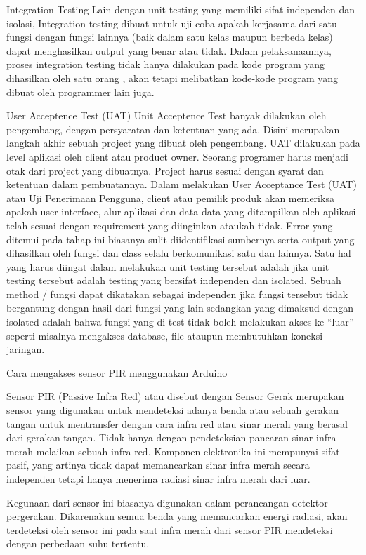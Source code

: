 Integration Testing
Lain dengan unit testing yang memiliki sifat independen dan isolasi, Integration testing dibuat untuk uji coba apakah kerjasama dari satu fungsi dengan fungsi lainnya (baik dalam satu kelas maupun berbeda kelas) dapat menghasilkan output yang benar atau tidak. Dalam pelaksanaannya, proses integration testing tidak hanya dilakukan pada kode program yang dihasilkan oleh satu orang , akan tetapi melibatkan  kode-kode program yang dibuat oleh programmer lain juga.

User Acceptence Test (UAT)
Unit Acceptence Test banyak dilakukan oleh pengembang, dengan persyaratan dan ketentuan yang ada. Disini merupakan langkah akhir sebuah project yang dibuat oleh pengembang. UAT dilakukan pada level aplikasi oleh client atau product owner. Seorang programer harus menjadi otak dari project yang dibuatnya. Project harus sesuai dengan syarat dan ketentuan dalam pembuatannya.
Dalam melakukan User Acceptance Test (UAT) atau Uji Penerimaan Pengguna, client atau pemilik produk akan memeriksa apakah user interface, alur aplikasi dan data-data yang ditampilkan oleh aplikasi telah sesuai dengan requirement yang diinginkan ataukah tidak. Error yang ditemui pada tahap ini biasanya sulit diidentifikasi sumbernya serta output yang dihasilkan oleh fungsi dan class selalu berkomunikasi satu dan lainnya.
Satu hal yang harus diingat dalam melakukan unit testing tersebut adalah jika unit testing tersebut adalah testing yang bersifat independen dan isolated. Sebuah method / fungsi dapat dikatakan sebagai independen jika fungsi tersebut tidak bergantung dengan hasil dari fungsi yang lain sedangkan yang dimaksud dengan isolated adalah bahwa fungsi yang di test tidak boleh melakukan akses ke “luar” seperti misalnya mengakses database, file ataupun membutuhkan koneksi jaringan.


Cara mengakses sensor PIR menggunakan Arduino

Sensor PIR (Passive Infra Red) atau disebut dengan Sensor Gerak merupakan sensor yang digunakan untuk mendeteksi adanya benda atau sebuah gerakan tangan untuk mentransfer dengan cara infra red atau sinar merah yang berasal dari gerakan tangan. Tidak hanya dengan pendeteksian pancaran sinar infra merah melaikan sebuah infra red.
Komponen elektronika ini mempunyai sifat pasif, yang artinya tidak dapat memancarkan sinar infra merah secara independen tetapi hanya menerima radiasi sinar infra merah dari luar.

Kegunaan dari sensor ini biasanya digunakan dalam perancangan detektor pergerakan. Dikarenakan semua benda yang memancarkan energi radiasi, akan terdeteksi oleh sensor ini pada saat infra merah dari sensor PIR mendeteksi dengan perbedaan suhu tertentu.

